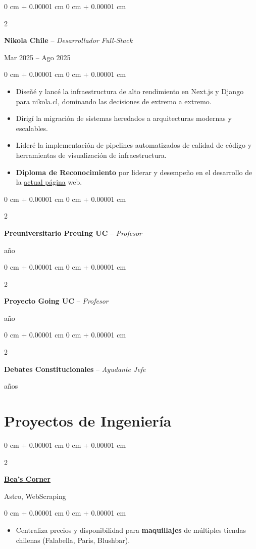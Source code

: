 \documentclass[10pt, letterpaper]{article}
\newenvironment{highlights}{
    \begin{itemize}[
        topsep=0.10 cm,
        parsep=0.10 cm,
        partopsep=0pt,
        itemsep=0pt,
        leftmargin=0 cm + 10pt
    ]
}{
    \end{itemize}
} %
\newenvironment{onecolentry}{
    \begin{adjustwidth}{
        0 cm + 0.00001 cm
    }{
        0 cm + 0.00001 cm
    }
}{
    \end{adjustwidth}
} %
\newenvironment{twocolentry}[2][]{
    \onecolentry
    \def\secondColumn{#2}
    \setcolumnwidth{\fill, 4.5 cm}
    \begin{paracol}{2}
}{
    \switchcolumn \raggedleft \secondColumn
    \end{paracol}
    \endonecolentry
} %
\let\hrefWithoutArrow\href
\begin{document}
    \begin{twocolentry}{Mar 2025 – Ago 2025}
        \textbf{Nikola Chile} -- \textit{Desarrollador Full-Stack}
    \end{twocolentry}
    \vspace{0.10 cm}
    \begin{onecolentry}
        \begin{highlights}
            \item Diseñé y lancé la infraestructura de alto rendimiento en Next.js y Django para nikola.cl, dominando las decisiones de extremo a extremo.
            \item Dirigí la migración de sistemas heredados a arquitecturas modernas y escalables.
            \item Lideré la implementación de pipelines automatizados de calidad de código y herramientas de visualización de infraestructura.
            \item \textbf{Diploma de Reconocimiento} por liderar y desempeño en el desarrollo de la \href{www.nikola.cl}{actual página} web.
        \end{highlights}
    \end{onecolentry}
    \vspace{0.2 cm}

    \begin{twocolentry}{1 año}
        \textbf{Preuniversitario PreuIng UC} -- \textit{Profesor}
    \end{twocolentry}
    \vspace{0.2 cm}

    \begin{twocolentry}{1 año}
        \textbf{Proyecto Going UC} -- \textit{Profesor}
    \end{twocolentry}
    \vspace{0.2 cm}

    \begin{twocolentry}{2 años}
        \textbf{Debates Constitucionales} -- \textit{Ayudante Jefe}
    \end{twocolentry}

    \section{Proyectos de Ingeniería}

    \begin{twocolentry}{Astro, WebScraping}
        \textbf{\hrefWithoutArrow{https://beascorner.onrender.com/}{Bea's Corner}}
    \end{twocolentry}
    \vspace{0.10 cm}
    \begin{onecolentry}
        \begin{highlights}
            \item Centraliza precios y disponibilidad  para \textbf{maquillajes} de múltiples tiendas chilenas (Falabella, Paris, Blushbar).
        \end{highlights}
    \end{onecolentry}
    \vspace{0.2 cm}
\end{document}
